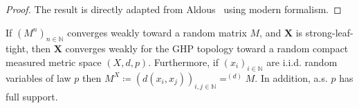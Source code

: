 \documentclass[AHL,Unicode,published]{cedram}
\newcommand{\N}{\mathbb{N}}
\newcommand{\1}{\mathbbm{1}}
\newcommand{\bfX}{\mathbf{X}}
\begin{document}
\begin{proof}
The result is directly adapted from Aldous~\cite[Theorem~3]{Ald93} using modern formalism.
\end{proof}

\begin{prop}\label{B2}
If $(M^n)_{n\in \N}$ converges weak\-ly toward a random matrix $M$, and $\bfX$ is strong-leaf-tight, then $\bfX$ converges weakly for the GHP topology toward a random compact measured metric space $(X,d,p)$. Furthermore, if $(x_i)_{i\in \N}$ are i.i.d. random variables of law $p$ then $M^X\coloneqq(d(x_i,x_j))_{i,j\in \N}=^{(d)} M$. In addition, a.s. $p$ has full support.
\end{prop}

\end{document}
